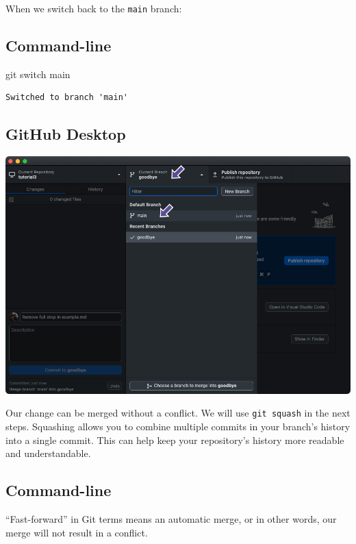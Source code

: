 \documentclass[
  letterpaper,
  DIV=11,
  numbers=noendperiod]{scrartcl}
\newenvironment{Shaded}{\begin{snugshade}}{\end{snugshade}}
\newcommand{\ControlFlowTok}[1]{\textcolor[rgb]{0.00,0.23,0.31}{#1}}
\newcommand{\NormalTok}[1]{\textcolor[rgb]{0.00,0.23,0.31}{#1}}
\begin{document}
When we switch back to the \texttt{main} branch:

\subsection{Command-line}

\begin{Shaded}
\begin{Highlighting}[]
\NormalTok{git }\ControlFlowTok{switch}\NormalTok{ main}
\end{Highlighting}
\end{Shaded}

\begin{verbatim}
Switched to branch 'main'
\end{verbatim}

\subsection{GitHub Desktop}

\includegraphics{images/image69.png}

Our change can be merged without a conflict. We will use
\texttt{git\ squash} in the next steps. Squashing allows you to combine
multiple commits in your branch's history into a single commit. This can
help keep your repository's history more readable and understandable.

\subsection{Command-line}

``Fast-forward'' in Git terms means an automatic merge, or in other
words, our merge will not result in a conflict.
\end{document}
